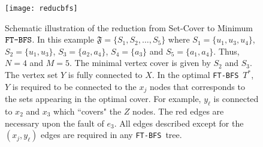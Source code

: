 \documentclass[12pt]{article}
\def\Set{\mathfrak{F}}
\def\FTBFS{\mbox{\tt FT-BFS}}
\begin{document}
\begin{figure}[ht!]
\begin{center}
\texttt{[image: reducbfs]}
\caption{
\label{fig:reducbfs}
Schematic illustration of the reduction
from Set-Cover to Minimum $\FTBFS$.
In this example $\Set=\{S_1, S_2, \ldots, S_5\}$
where $S_1=\{u_1, u_3, u_4\}$, $S_2=\{u_1, u_3\}$, $S_3=\{a_2, a_4\}$,
$S_4=\{a_3\}$ and $S_5=\{a_1, a_4\}$. Thus, $N=4$ and $M=5$.
The minimal vertex cover is given by $S_2$
and $S_3$. The vertex set $Y$ is fully connected to $X$.
In the optimal \FTBFS\ $T^*$, $Y$ is required to be connected to the $x_j$ nodes that corresponds to the sets appearing in the optimal cover. For example, $y_\ell$
is connected to $x_2$ and $x_3$ which ``covers" the $Z$ nodes.
The red edges are necessary upon the fault of
$e_3$. All edges described except for the $(x_j,y_\ell)$ edges are required in any
 \FTBFS\ tree. }
\end{center}
\end{figure}
\end{document}
